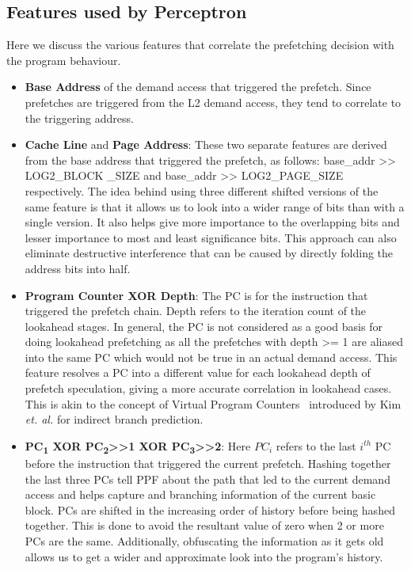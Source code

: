 \subsection{Features used by Perceptron}
\label{Impl-Features}
Here we discuss the various features that correlate the prefetching decision
with the program behaviour.

\begin{itemize}
\item \textbf{Base Address} of the demand access that triggered the
  prefetch.  Since prefetches are triggered from the L2 demand access,
  they tend to correlate to the triggering address.

\item \textbf{Cache Line} and \textbf{Page Address}: These two
  separate features are derived from the base address that triggered
  the prefetch, as follows: base\_addr >> LOG2\_BLOCK \_SIZE and
  base\_addr >> LOG2\_PAGE\_SIZE respectively.  The idea behind using
  three different shifted versions of the same feature is that it
  allows us to look into a wider range of bits than with a single
  version.  It also helps give more importance to the overlapping bits
  and lesser importance to most and least significance bits.  This
  approach can also eliminate destructive interference that can be
  caused by directly folding the address bits into half.


\item \textbf{Program Counter XOR Depth}: The PC is for the instruction
  that triggered the prefetch chain.  Depth refers to the iteration count of
  the lookahead stages.  In general, the PC is not considered as a good basis
  for doing lookahead prefetching as all the prefetches with depth >= 1 are
  aliased into the same PC which would not be true in an actual demand access.
  This feature resolves a PC into a different value for each lookahead depth
  of prefetch speculation, giving a more accurate correlation in lookahead
  cases.  This is akin to the concept of Virtual Program Counters~\cite{VPC}
  introduced by Kim \textit{et. al.} for indirect branch prediction.

\item \textbf{PC\textsubscript{1} XOR PC\textsubscript{2}>>1 XOR
  PC\textsubscript{3}>>2}: Here $PC_i$ refers to the last $i^{th}$
  PC before the instruction that triggered the current prefetch.
  Hashing together the last three PCs tell PPF about the path
  that led to the current demand access and helps capture and
  branching information of the current basic block.  PCs are shifted
  in the increasing order of history before being hashed together.
  This is done to avoid the resultant value of zero when 2 or more
  PCs are the same.  Additionally, obfuscating the information as it
  gets old allows us to get a wider and approximate look into the
  program's history.


\end{itemize}
